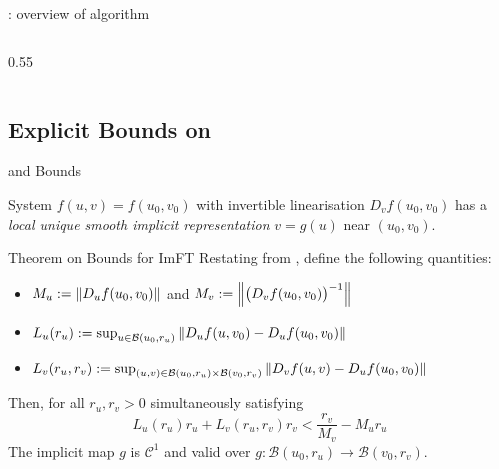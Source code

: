 \documentclass[11pt]{beamer}
\begin{document}
\begin{frame}{\LSR{}: overview of algorithm}
\begin{columns}
\begin{column}{0.55\textwidth}
        \end{column}
    \end{columns}
\end{frame}

\subsection{Explicit Bounds on \ImFT{}}

\begin{frame}{\ImFT{} and Bounds}

    \setlength{\abovedisplayskip}{3pt}
    \setlength{\belowdisplayskip}{3pt}
    \setlength{\jot}{1pt}

    \begin{block}{\ImFT{}}
        System \(f(u,v)=f(u_0,v_0)\) with invertible linearisation \(D_{v}f(u_0,v_0)\) has a \textit{local unique smooth implicit representation} \(v=g(u)\) near \((u_0,v_0)\).
    \end{block} \pause
    \begin{block}{Theorem on Bounds for ImFT}
        Restating from \cite[Corollary 3.8]{jindal2024estimates}, define the following quantities:
        \begin{itemize}
            \item \(M_{u} := \norm{D_{u}f(u_0,v_0)}\) and \(M_{v} := \norm{\big(D_{v}f(u_0,v_0)\big)^{-1}}\)
            \item \(L_u(r_u) := \sup_{u\in\mathcal{B}(u_0,r_u)} \norm{D_{u}f(u,v_0)-D_{u}f(u_0,v_0)}\)
            \item \(L_v(r_u,r_v) := \sup_{(u,v)\in\mathcal{B}(u_0,r_u)\times\mathcal{B}(v_0,r_v)} \norm{D_{v}f(u,v)-D_{u}f(u_0,v_0)}\)
        \end{itemize} \pause
        Then, for all \(r_u,r_v>0\) simultaneously satisfying
        \begin{equation*}
            L_{u}(r_u)r_u + L_{v}(r_u,r_v)r_v < \frac{r_v}{M_v} - M_ur_u
        \end{equation*}
        The implicit map \(g\) is \(\mathcal{C}^{1}\) and valid over \(g:\mathcal{B}(u_0,r_u)\to\mathcal{B}(v_0,r_v)\).
    \end{block}
\end{frame}
\end{document}
